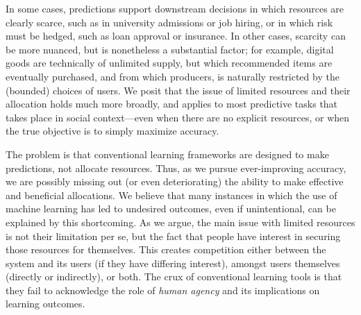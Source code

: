 

In some cases, predictions support downstream decisions in which resources are clearly scarce, such as in university admissions or job hiring,
or in which risk must be hedged,
such as loan approval or insurance.
In other cases, scarcity can be more nuanced, but is nonetheless a substantial factor; for example, digital goods are technically of unlimited supply,
but which recommended items are eventually purchased,
and from which producers,
is naturally restricted by the (bounded) choices of users.
We posit that the issue of limited resources and their allocation holds much more broadly,
and applies to most predictive tasks that takes place in social context---even when there are no explicit resources,
or when the true objective is to simply maximize accuracy.
\squeeze

The problem is that conventional learning frameworks are designed to make predictions, not allocate resources.
Thus, as we pursue ever-improving accuracy,
we are possibly missing out (or even deteriorating) the ability to make effective and beneficial allocations.
We believe that many instances in which the use of machine learning has led to 
undesired outcomes, even if unintentional, can be explained by this shortcoming.
As we argue, the main issue with limited resources is not their limitation per se,
but the fact that people have interest in securing those resources for themselves.
This creates competition either between the system and its users
(if they have differing interest),
amongst users themselves (directly or indirectly), or both.
The crux of conventional learning tools is that they fail to acknowledge the role of \emph{human agency} and its implications on learning outcomes.
\squeeze

